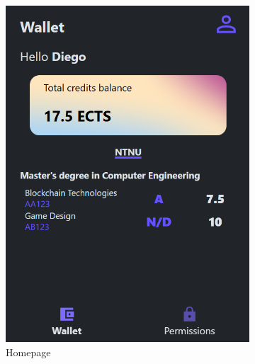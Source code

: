 \begin{figure}
    \centering
    \begin{subfigure}{.45\textwidth}
        \centering
        \includegraphics[width=\textwidth]{figures/Homepage.png}
        \caption{Homepage}
        \label{sfig:homepageExt}
    \end{subfigure}
    \hfill
    \begin{subfigure}{.45\textwidth}
        \centering

\end{subfigure}
\end{figure}
